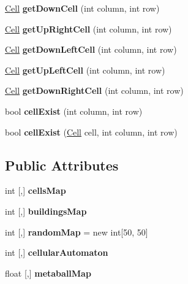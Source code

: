 \begin{DoxyCompactItemize}
\mbox{\hyperlink{class_cell}{Cell}} {\bfseries get\+Down\+Cell} (int column, int row)
\item 
\mbox{\label{class_map_af4835f210299a888dae3a9b236b67525}} 
\mbox{\hyperlink{class_cell}{Cell}} {\bfseries get\+Up\+Right\+Cell} (int column, int row)
\item 
\mbox{\label{class_map_aac6d6dec8863a98f945f5885ea6f58d6}} 
\mbox{\hyperlink{class_cell}{Cell}} {\bfseries get\+Down\+Left\+Cell} (int column, int row)
\item 
\mbox{\label{class_map_a63a6daa68c08b2a4757ee4de25648752}} 
\mbox{\hyperlink{class_cell}{Cell}} {\bfseries get\+Up\+Left\+Cell} (int column, int row)
\item 
\mbox{\label{class_map_a7c72f8ee61b5d9fef2c90fef7d4737c2}} 
\mbox{\hyperlink{class_cell}{Cell}} {\bfseries get\+Down\+Right\+Cell} (int column, int row)
\item 
\mbox{\label{class_map_a11ef63e8e54cceb754bba3918f431207}} 
bool {\bfseries cell\+Exist} (int column, int row)
\item 
\mbox{\label{class_map_ac1671cb6cbb53c3004d7103f9d4636ec}} 
bool {\bfseries cell\+Exist} (\mbox{\hyperlink{class_cell}{Cell}} cell, int column, int row)
\end{DoxyCompactItemize}
\subsection*{Public Attributes}
\begin{DoxyCompactItemize}
\item 
\mbox{\label{class_map_a832e8ad7d3602ffbe79ea1be56e3a37f}} 
int \mbox{[},\mbox{]} {\bfseries cells\+Map}
\item 
\mbox{\label{class_map_a3d1f4addd540cf17249fcaa960ce86e6}} 
int \mbox{[},\mbox{]} {\bfseries buildings\+Map}
\item 
\mbox{\label{class_map_aa2a5c2d5326ecb2c99b6e5cef499105f}} 
int \mbox{[},\mbox{]} {\bfseries random\+Map} = new int\mbox{[}50, 50\mbox{]}
\item 
\mbox{\label{class_map_a5a1ddb35e0e2cb98ef8cb6f26cf314ea}} 
int \mbox{[},\mbox{]} {\bfseries cellular\+Automaton}
\item 
\mbox{\label{class_map_a0b2ef1a9bfca567879d44cd81dbb961f}} 
float \mbox{[},\mbox{]} {\bfseries metaball\+Map}
\end{DoxyCompactItemize}
